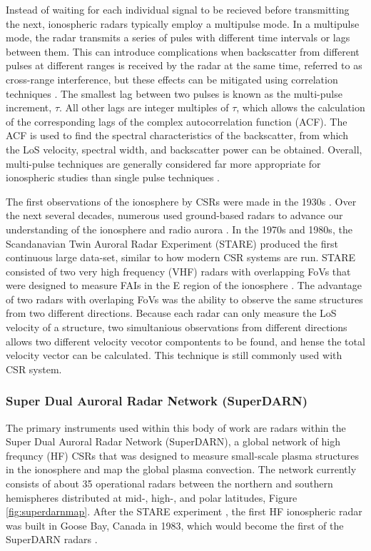 Instead of waiting for each individual signal to be recieved before transmitting the next, ionospheric radars typically employ a multipulse mode. In a multipulse mode, the radar transmits a series of pules with different time intervals or lags between them.  This can introduce complications when backscatter from different pulses at different ranges is received by the radar at the same time, referred to as cross-range interference, but these effects can be mitigated using correlation techniques \citep{Farley1972}.  The smallest lag between two pulses is known as the multi-pulse increment, \(\tau\).  All other lags are integer multiples of \(\tau\), which allows the calculation of the corresponding lags of the complex autocorrelation function (ACF).  The ACF is used to find the spectral characteristics of the backscatter, from which the LoS velocity, spectral width, and backscatter power can be obtained.  Overall, multi-pulse techniques are generally considered far more appropriate for ionospheric studies than single pulse techniques \citep{Farley1972,Greenwald1983,Greenwald1985,Barthes1998,Ponomarenko2006}.

The first observations of the ionosphere by CSRs were made in the 1930s \citep{Eckersley1937,Harang1938}.  Over the next several decades, numerous used ground-based radars to advance our understanding of the ionosphere and radio aurora \citep{Hultqvist1964,Leadabrand1965,LangeHesse1967,Unwin1972,Sahr1996}.  In the 1970s and 1980s, the Scandanavian Twin Auroral Radar Experiment (STARE) produced the first continuous large data-set, similar to how modern CSR systems are run.  STARE consisted of two very high frequency (VHF) radars with overlapping FoVs that were designed to measure FAIs in the E region of the ionosphere \citep{Greenwald1997}.  The advantage of two radars with overlaping FoVs was the ability to observe the same structures from two different directions.  Because each radar can only measure the LoS velocity of a structure, two simultanious observations from different directions allows two different velocity vecotor compontents to be found, and hense the total velocity vector can be calculated.  This technique is still commonly used with CSR system.

\subsubsection{Super Dual Auroral Radar Network (SuperDARN)}
\label{sec:superdarn}
The primary instruments used within this body of work are radars within the Super Dual Auroral Radar Network (SuperDARN), a global network of high frequncy (HF) CSRs that was designed to measure small-scale plasma structures in the ionosphere and map the global plasma convection.  The network currently consists of about 35 operational radars between the northern and southern hemispheres distributed at mid-, high-, and polar latitudes, Figure \ref{fig:superdarnmap}.  After the STARE experiment \citep{Greenwald1978}, the first HF ionospheric radar was built in Goose Bay, Canada in 1983, which would become the first of the SuperDARN radars \citep{Greenwald1985}.  

